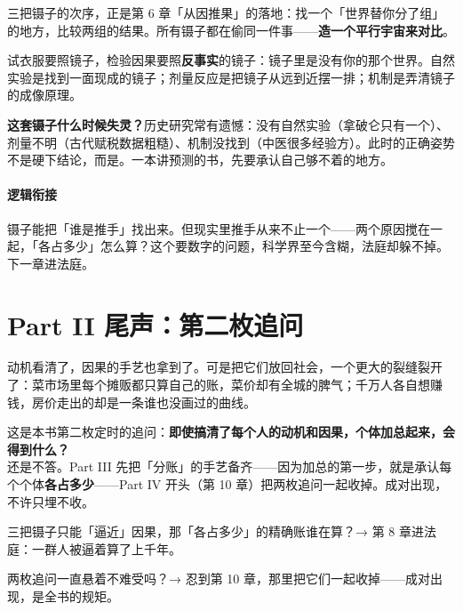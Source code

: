 \documentclass[../../main2.tex]{subfiles}
\begin{document}
三把镊子的次序，正是第 6 章「从因推果」的落地：找一个「世界替你分了组」的地方，比较两组的结果。所有镊子都在偷同一件事——\textbf{造一个平行宇宙来对比}。

\begin{tcolorbox}[colback=green!5, title=\textit{生活类比}]
	试衣服要照镜子，检验因果要照\textbf{反事实}的镜子：镜子里是没有你的那个世界。自然实验是找到一面现成的镜子；剂量反应是把镜子从远到近摆一排；机制是弄清镜子的成像原理。
\end{tcolorbox}

\begin{warningbox}
	\textbf{这套镊子什么时候失灵？}历史研究常有遗憾：没有自然实验（拿破仑只有一个）、剂量不明（古代赋税数据粗糙）、机制没找到（中医很多经验方）。此时的正确姿势不是硬下结论，而是。一本讲预测的书，先要承认自己够不着的地方。
\end{warningbox}

\paragraph*{逻辑衔接}
	镊子能把「谁是推手」找出来。但现实里推手从来不止一个——两个原因搅在一起，「各占多少」怎么算？这个要数字的问题，科学界至今含糊，法庭却躲不掉。下一章进法庭。

\section{Part II 尾声：第二枚追问}

动机看清了，因果的手艺也拿到了。可是把它们放回社会，一个更大的裂缝裂开了：菜市场里每个摊贩都只算自己的账，菜价却有全城的脾气；千万人各自想赚钱，房价走出的却是一条谁也没画过的曲线。

\begin{warningbox}
	这是本书第二枚定时的追问：\textbf{即使搞清了每个人的动机和因果，个体加总起来，会得到什么？}\\
	还是不答。Part III 先把「分账」的手艺备齐——因为加总的第一步，就是承认每个个体\textbf{各占多少}——Part IV 开头（第 10 章）把两枚追问一起收掉。成对出现，不许只埋不收。
\end{warningbox}

\begin{reader_anticipation}
	\item 三把镊子只能「逼近」因果，那「各占多少」的精确账谁在算？→ 第 8 章进法庭：一群人被逼着算了上千年。
	\item 两枚追问一直悬着不难受吗？→ 忍到第 10 章，那里把它们一起收掉——成对出现，是全书的规矩。
\end{reader_anticipation}
\end{document}
